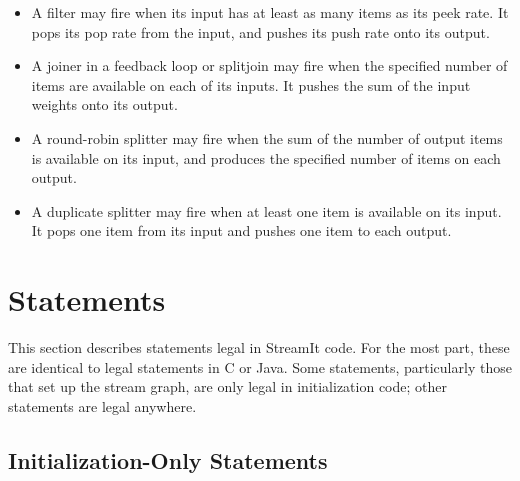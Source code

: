 \documentclass[11pt]{article}
\newcommand{\old}{\marginpar{\footnotesize \textbf{~~--~Old~--}}}
\begin{document}
\begin{itemize}
\item A filter may fire when its input has at least as many items as
  its peek rate.
  It pops its pop rate from the input, and pushes its push rate onto
  its output.
\item A joiner in a feedback loop or splitjoin may fire when the
  specified number of items are available on each of its inputs.  It
  pushes the sum of the input weights onto its output.
\item A round-robin splitter may fire when the sum {\old} of the
  number of output items is available on its input, and produces the
  specified number of items on each output.
\item A duplicate splitter may fire when at least one item is
  available on its input.  It pops one item from its input and pushes
  one item to each output.
\end{itemize}

\section{Statements}

This section describes statements legal in StreamIt code.  For the
most part, these are identical to legal statements in C or Java.  Some
statements, particularly those that set up the stream graph, are only
legal in initialization code; other statements are legal anywhere.

\subsection{Initialization-Only Statements}
\end{document}
